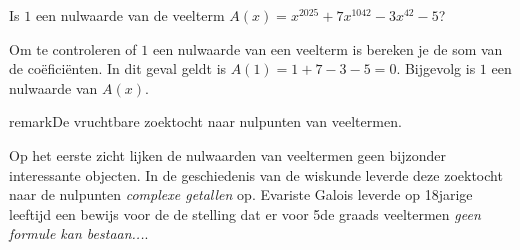 \documentclass{ximera}
\begin{document}
\begin{exercise}
    Is \(1\) een nulwaarde van de veelterm \( A(x) = x^{2025} + 7x^{1042} - 3x^{42} - 5\)? 
    \begin{oplossing}
    Om te controleren of \(1\) een nulwaarde van een veelterm is bereken je de som van de coëficiënten. In dit geval geldt is \(A(1) = 1 + 7 - 3 - 5 = 0\). Bijgevolg is \(1\) een nulwaarde van \(A(x)\).  
    \end{oplossing}
\end{exercise}



\begin{expandable}{remark}{De vruchtbare zoektocht naar nulpunten van veeltermen.}

    Op het eerste zicht lijken de nulwaarden van veeltermen geen bijzonder interessante objecten. In de geschiedenis van de wiskunde leverde deze zoektocht naar de nulpunten \textit{complexe getallen} op.  
    Evariste Galois leverde op 18jarige leeftijd een bewijs voor de de stelling dat er voor 5de graads veeltermen \textit{geen formule kan bestaan...}. 
    
\end{expandable}
\end{document}
